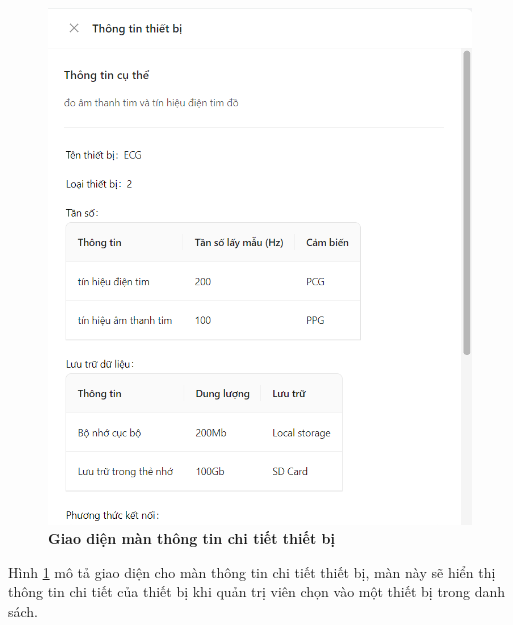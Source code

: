 \begin{figure}[H]
  \centering
  \includegraphics[scale=0.7]{Images/server/webUI/deviceInfo_1.png}
  \caption[Giao diện màn thông tin chi tiết thiết bị]{\bfseries \fontsize{12pt}{0pt}\selectfont Giao diện màn thông tin chi tiết thiết bị}
  \label{deviceInfo} %
\end{figure}

Hình \ref{deviceInfo} mô tả giao diện cho màn thông tin chi tiết thiết bị, màn này sẽ hiển thị thông tin
chi tiết của thiết bị khi quản trị viên chọn vào một thiết bị trong danh sách.

